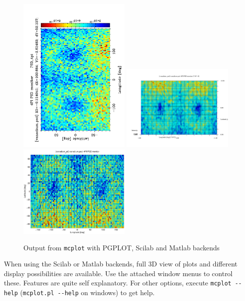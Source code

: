 \begin{figure}[htb!]
  \begin{center}
    \includegraphics[angle=-90,width=0.49\textwidth]{figures/mcplot_PGPLOT}
    \includegraphics[angle=-90,width=0.49\textwidth]{figures/mcplot_Scilab}
    \includegraphics[width=0.49\textwidth]{figures/mcplot_Matlab}
  \end{center}
\caption{Output from \texttt{mcplot} with PGPLOT, Scilab and Matlab backends}
\label{fig:mcplot_figs}
\end{figure}
When using the Scilab or Matlab backends, full 3D view of plots and
different display possibilities are available. Use the attached \MCS
window menus to control these. Features are quite self
explanatory. For other options, execute \verb+mcplot --help+
(\verb+mcplot.pl --help+ on windows) to get help.

